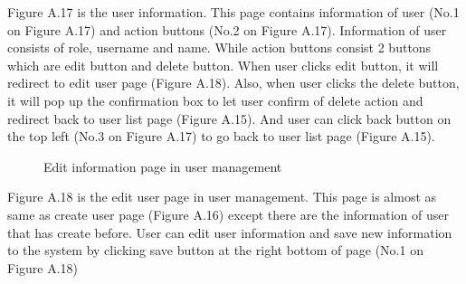 \documentclass[12pt,oneside,openright,a4paper]{cpe-english-project}
\begin{document}
Figure A.17 is the user information. This page contains information of user (No.1 on 
Figure A.17) and action buttons (No.2 on Figure A.17).
Information of user consists of role, username and name. While action buttons 
consist 2 buttons which are edit button and delete button. When user clicks edit button, it 
will redirect to edit user page (Figure A.18). Also, when user clicks the delete button, it will 
pop up the confirmation box to let user confirm of delete action and redirect back to user list 
page (Figure A.15). And user can click back button on the top left (No.3 on Figure A.17) to 
go back to user list page (Figure A.15).

\begin{figure}[!h]\centering
{}
\caption{Edit information page in user management}
\label{fig:Edit information page in user management}
\end{figure}

Figure A.18 is the edit user page in user management. This page is almost as same as 
create user page (Figure A.16) except there are the information of user that has create before. 
User can edit user information and save new information to the system by clicking save 
button at the right bottom of page (No.1 on Figure A.18)
\end{document}
